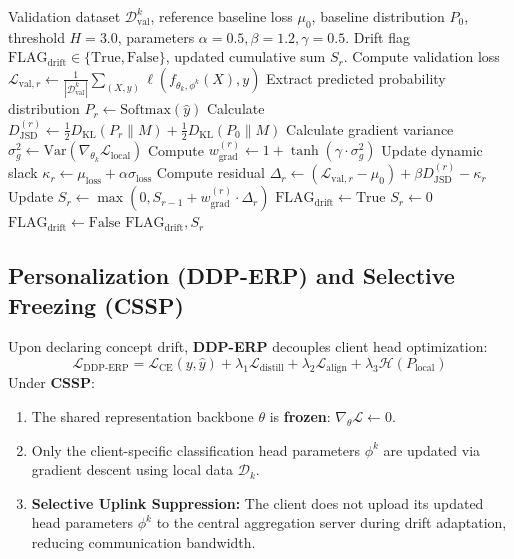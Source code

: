 \documentclass[10pt,a4paper,twocolumn,twoside]{article}
\begin{document}
\begin{algorithm}[!t]
\caption{Adaptive Divergence-Weighted CUSUM (AD-CUSUM)}\label{alg:ad_cusum}
\begin{algorithmic}[1]
\REQUIRE Validation dataset $\mathcal{D}_{\text{val}}^k$, reference baseline loss $\mu_0$, baseline distribution $P_0$, threshold $H = 3.0$, parameters $\alpha = 0.5, \beta = 1.2, \gamma = 0.5$.
\ENSURE Drift flag $\text{FLAG}_{\text{drift}} \in \{\text{True}, \text{False}\}$, updated cumulative sum $S_r$.
\STATE Compute validation loss $\mathcal{L}_{\text{val}, r} \leftarrow \frac{1}{|\mathcal{D}_{\text{val}}^k|} \sum_{(X, y)} \ell(f_{\theta_k, \phi^k}(X), y)$
\STATE Extract predicted probability distribution $P_r \leftarrow \text{Softmax}(\hat{y})$
\STATE Calculate $D_{\text{JSD}}^{(r)} \leftarrow \frac{1}{2} D_{\text{KL}}(P_r \parallel M) + \frac{1}{2} D_{\text{KL}}(P_0 \parallel M)$
\STATE Calculate gradient variance $\sigma_g^2 \leftarrow \text{Var}(\nabla_{\theta_k} \mathcal{L}_{\text{local}})$
\STATE Compute $w_{\text{grad}}^{(r)} \leftarrow 1 + \tanh(\gamma \cdot \sigma_g^2)$
\STATE Update dynamic slack $\kappa_r \leftarrow \mu_{\text{loss}} + \alpha \sigma_{\text{loss}}$
\STATE Compute residual $\Delta_r \leftarrow (\mathcal{L}_{\text{val}, r} - \mu_0) + \beta D_{\text{JSD}}^{(r)} - \kappa_r$
\STATE Update $S_r \leftarrow \max\left(0, S_{r-1} + w_{\text{grad}}^{(r)} \cdot \Delta_r\right)$
    \STATE $\text{FLAG}_{\text{drift}} \leftarrow \text{True}$
    \STATE $S_r \leftarrow 0$ 
\ELSE
    \STATE $\text{FLAG}_{\text{drift}} \leftarrow \text{False}$
\ENDIF
\RETURN $\text{FLAG}_{\text{drift}}, S_r$
\end{algorithmic}
\end{algorithm}

\subsection{Personalization (DDP-ERP) and Selective Freezing (CSSP)}
Upon declaring concept drift, \textbf{DDP-ERP} decouples client head optimization:
\begin{equation}
\mathcal{L}_{\text{DDP-ERP}} = \mathcal{L}_{\text{CE}}(y, \hat{y}) + \lambda_1 \mathcal{L}_{\text{distill}} + \lambda_2 \mathcal{L}_{\text{align}} + \lambda_3 \mathcal{H}(P_{\text{local}})
\end{equation}
Under \textbf{CSSP}:
\begin{enumerate}
    \item The shared representation backbone $\theta$ is \textbf{frozen}: $\nabla_\theta \mathcal{L} \leftarrow 0$.
    \item Only the client-specific classification head parameters $\phi^k$ are updated via gradient descent using local data $\mathcal{D}_k$.
    \item \textbf{Selective Uplink Suppression:} The client does not upload its updated head parameters $\phi^k$ to the central aggregation server during drift adaptation, reducing communication bandwidth.
\end{enumerate}
\end{document}
